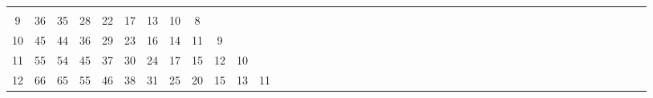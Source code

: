 \documentclass[12pt,a4paper]{amsart}
\theoremstyle{definition} %
\theoremstyle{plain} %
\begin{document}
\begin{table}[h]
{\begin{tabular}{|c|*{44}{c|}}
                    &             &             &             &             &             &             &             &             &             &             &             &             &             &             &             &             &             &             &             &             &             &             &             &             &             \\
            9 &         36 &         35 &         28 &         22 &         17 &         13 &         10 &          8 &            &             &             &             &             &             &             &             &             &             & 
                    &             &             &             &             &             &             &             &             &             &             &             &             &             &             &             &             &             &             &             &             &             &             &             &             &             \\
            10 &         45 &         44 &         36 &         29 &         23 &         16 &         14 &         11 &          9 &             &             &             &             &             &             &             &             &             & 
                   &             &             &             &             &             &             &             &             &             &             &             &             &             &             &             &             &             &             &             &             &             &             &             &             &             \\
            11 &         55 &         54 &         45 &         37 &         30 &         24 &         17 &         15 &         12 &          10 &             &             &             &             &             &             &             &             & 
                   &             &             &             &             &             &             &             &             &             &             &             &             &             &             &             &             &             &             &             &             &             &             &             &             &             \\
            12 &         66 &         65 &         55 &         46 &         38 &         31 &         25 &         20 &         15 &          13 &          11 &             &             &             &             &             &             &             & 

\end{tabular}}
\end{table}
\end{document}
